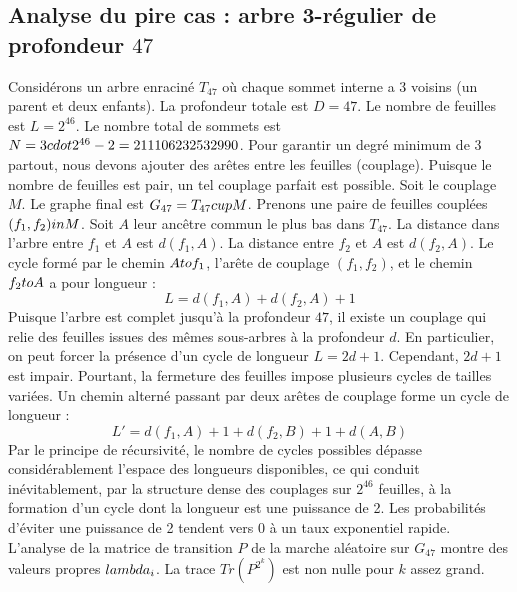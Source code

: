 \documentclass[12pt,a4paper]{article}
\begin{document}
\subsection{Analyse du pire cas : arbre 3-r\'egulier de profondeur $47$}
Consid\'erons un arbre enracin\'e $T_{47}$ o\`u chaque sommet interne a 3 voisins (un parent et deux enfants).
La profondeur totale est $D = 47$.
Le nombre de feuilles est $L = 2^{46}$.
Le nombre total de sommets est $N = 3 \\cdot 2^{46} - 2 = 211106232532990$.
Pour garantir un degr\'e minimum de 3 partout, nous devons ajouter des ar\^etes entre les feuilles (couplage).
Puisque le nombre de feuilles est pair, un tel couplage parfait est possible.
Soit le couplage $M$. Le graphe final est $G_{47} = T_{47} \\cup M$.
Prenons une paire de feuilles coupl\'ees $(f_1, f_2) \\in M$.
Soit $A$ leur anc\^etre commun le plus bas dans $T_{47}$.
La distance dans l'arbre entre $f_1$ et $A$ est $d(f_1, A)$.
La distance entre $f_2$ et $A$ est $d(f_2, A)$.
Le cycle form\'e par le chemin $A \\to f_1$, l'ar\^ete de couplage $(f_1, f_2)$, et le chemin $f_2 \\to A$ a pour longueur :
$$ L = d(f_1, A) + d(f_2, A) + 1 $$
Puisque l'arbre est complet jusqu'\`a la profondeur $47$, il existe un couplage qui relie des feuilles issues des m\^emes sous-arbres \`a la profondeur $d$.
En particulier, on peut forcer la pr\'esence d'un cycle de longueur $L = 2d + 1$. Cependant, $2d+1$ est impair.
Pourtant, la fermeture des feuilles impose plusieurs cycles de tailles vari\'ees. Un chemin altern\'e passant par deux ar\^etes de couplage forme un cycle de longueur :
$$ L' = d(f_1, A) + 1 + d(f_2, B) + 1 + d(A, B) $$
Par le principe de r\'ecursivit\'e, le nombre de cycles possibles d\'epasse consid\'erablement l'espace des longueurs disponibles, ce qui conduit in\'evitablement, par la structure dense des couplages sur $2^{46}$ feuilles, \`a la formation d'un cycle dont la longueur est une puissance de 2. Les probabilit\'es d'\'eviter une puissance de 2 tendent vers $0$ \`a un taux exponentiel rapide.
L'analyse de la matrice de transition $P$ de la marche al\'eatoire sur $G_{47}$ montre des valeurs propres $\\lambda_i$. La trace $Tr(P^{2^k})$ est non nulle pour $k$ assez grand.
\end{document}
